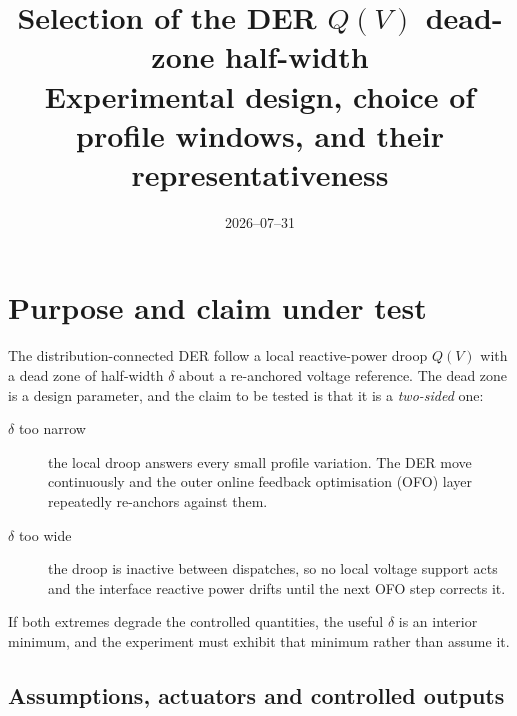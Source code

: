 \documentclass[11pt,a4paper]{article}
\title{Selection of the DER $Q(V)$ dead-zone half-width\\[2mm]
\large Experimental design, choice of profile windows, and their
representativeness}
\author{}
\date{2026--07--31}
\newcommand{\dz}{\ensuremath{\delta}}
\begin{document}
\maketitle
\tableofcontents

\section{Purpose and claim under test}

The distribution-connected DER follow a local reactive-power droop
$Q(V)$ with a dead zone of half-width $\dz$ about a re-anchored voltage
reference. The dead zone is a design parameter, and the claim to be tested is
that it is a \emph{two-sided} one:

\begin{description}
  \item[$\dz$ too narrow] the local droop answers every small profile
    variation. The DER move continuously and the outer online feedback
    optimisation (OFO) layer repeatedly re-anchors against them.
  \item[$\dz$ too wide] the droop is inactive between dispatches, so no local
    voltage support acts and the interface reactive power drifts until the next
    OFO step corrects it.
\end{description}

If both extremes degrade the controlled quantities, the useful $\dz$ is an
interior minimum, and the experiment must exhibit that minimum rather than
assume it.

\subsection{Assumptions, actuators and controlled outputs}
\end{document}
